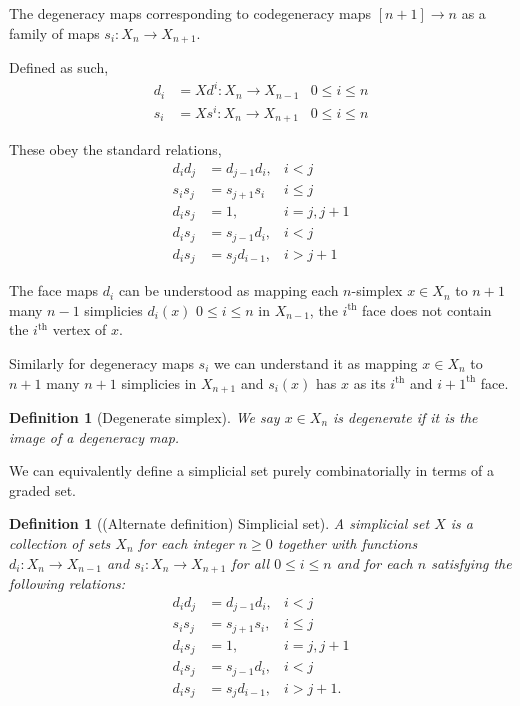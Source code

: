 \documentclass[12pt]{report}
\numberwithin{equation}{section}
\newtheorem{definition}[dummy]{Definition}
\begin{document}
	The degeneracy maps corresponding to codegeneracy maps $ [n+1] \to n$ as a family of maps $s_i: X_n \to X_{n+1}$.
	
	Defined as such,
	\begin{align*}
		d_i &= X d^i : X_n \to X_{n-1} & 0 \leq i \leq n \\
		s_i &= X s^i : X_n \to X_{n+1} & 0 \leq i \leq n
	\end{align*}
	
	
	These obey the standard relations,
	\begin{align*}
		d_id_j &= d_{j-1}d_i, &i <j\\
		s_is_j&=s_{j+1}s_i &i \leq j\\
		d_is_j&=1, &i=j,j+1\\
		d_is_j&=s_{j-1}d_i,& i<j\\
		d_is_j&=s_jd_{i-1},& i>j+1
	\end{align*}
	
	The face maps $d_i$ can be understood as mapping each $n$-simplex $x\in X_n$ to $n+1$ many $n-1$ simplicies $d_i(x)$ $0\leq i \leq n$ in $X_{n-1} $, the $i^\mathrm{th}$ face does not contain the $i^{\mathrm{th}}$ vertex of $x$. 
	
	Similarly for degeneracy maps $s_i$ we can understand it as mapping $x \in X_n $ to $n+1$ many $n+1$ simplicies in $X_{n+1} $ and $s_i(x)$ has $x$ as its $i^{\mathrm{th}} $ and $i+1^{\mathrm{th}}$ face. 
	
	\begin{definition}[Degenerate simplex]
		We say $x \in X_n$ is degenerate if it is the image of a degeneracy map.
	\end{definition}
	
	We can equivalently define a simplicial set purely combinatorially in terms of a graded set.
	\begin{definition}[(Alternate definition) Simplicial set]
		A \textit{simplicial set} \( X \) is a collection of sets \( X_n \) for each integer \( n \geq 0 \) together with functions 
		\( d_i : X_n \to X_{n-1} \) and \( s_i : X_n \to X_{n+1} \) for all \( 0 \leq i \leq n \) and for each \( n \) satisfying the following relations:  
		\begin{align*}
			d_i d_j &= d_{j-1} d_i, & i < j \\
			s_i s_j &= s_{j+1} s_i, & i \leq j \\
			d_i s_j &= 1, & i = j, j+1 \\
			d_i s_j &= s_{j-1} d_i, & i < j \\
			d_i s_j &= s_j d_{i-1}, & i > j+1.
		\end{align*}
	\end{definition}
	
\end{document}
